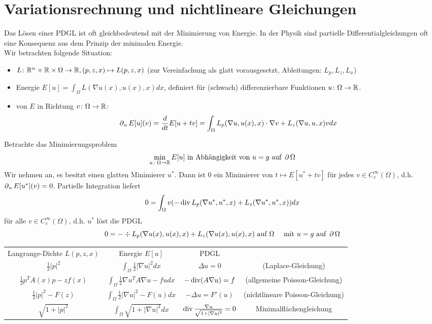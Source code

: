\section{Variationsrechnung und nichtlineare Gleichungen}
\label{sec:para10}
	Das Lösen einer PDGL ist oft gleichbedeutend mit der Minimierung von Energie. In der Physik sind partielle Differentialgleichungen oft eine Konsequenz aus dem Prinzip der minimalen Energie. \\
	Wir betrachten folgende Situation:
	\begin{itemize}
		\item {} $L\colon \mathbb{R}^n \times \mathbb{R} \times \Omega \rightarrow \mathbb{R}, (p,z,x) \mapsto L(p,z,x)$ (zur Vereinfachung als glatt vorausgesetzt, Ableitungen: $L_p,L_z,L_x$)
		\item Energie $E[u] = \int_\Omega L(\nabla u(x),u(x),x)dx$, definiert für (schwach) differenzierbare Funktionen $u\colon \Omega \rightarrow \mathbb{R}$.
		\item {} von $E$ in Richtung $v\colon \Omega \rightarrow \mathbb{R}$:
		\[ \operatorname{\partial}_u E[u](v) = \frac{d}{dt} E[u+tv] = \int_{\Omega} L_p(\nabla u,u(x),x) \cdot \nabla v + L_z(\nabla u, u, x) v dx \]
	\end{itemize}
	Betrachte das Minimierungsproblem
	\[ \min_{u \colon \Omega \rightarrow \mathbb{R}} E[u] \text{ in Abhängigkeit von } u = g \text{ auf } \operatorname{\partial} \Omega \]
	Wir nehmen an, es besitzt einen glatten Minimierer $u^*$. Dann ist 0 ein Minimierer von $t \mapsto E[u^*+tv]$ für jedes $v \in C_c^\infty(\Omega)$, d.h. $\operatorname{\partial}_u E[u^*](v) = 0$. Partielle Integration liefert
	\[ 0 = \int_{\Omega} v(-\operatorname{div} L_p(\nabla u^*,u^*,x) + L_z(\nabla u^*,u^*,x)) dx \]
	für alle $v \in C_c^\infty (\Omega)$, d.h. $u^*$ löst die PDGL
	\[ 0 = -\div L_p(\nabla u(x),u(x),x) + L_z(\nabla u(x),u(x),x) \text{ auf } \Omega \quad \text{ mit } u = g \text{ auf } \operatorname{\partial} \Omega \]
	
\begin{bsp} \label{bsp_75}
\marginnote{[75]} \begin{tabular}{cccc}
Langrange-Dichte $L(p,z,x)$ & Energie $E[u]$ & PDGL &  \\ 
$\frac{1}{2} |p|^2$ & $\int_\Omega \frac{1}{2} |\nabla u|^2 dx$ & $\Delta u = 0$ & (Laplace-Gleichung) \\ 
$\frac{1}{2} p^T A(x)p - zf(x)$ & $\int_\Omega \frac{1}{2} \nabla u^T A \nabla u - fu dx$ & $-\operatorname{div}(A\nabla u) = f$ & (allgemeine Poisson-Gleichung) \\ 
$\frac{1}{2} |p|^2 - F(z)$ & $\int_\Omega \frac{1}{2} |\nabla u|^2 - F(u) dx$ & $-\Delta u = F'(u)$ & (nichtlineare Poisson-Gleichung) \\ 
$\sqrt{1+|p|^2}$ & $\int_\Omega \sqrt{1+ |\nabla u|^2} dx$ & $\operatorname{div} \frac{\nabla u}{\sqrt{1+ |\nabla u|^2}} = 0$ & Minimalflächengleichung \\ 
\end{tabular}
\end{bsp}

